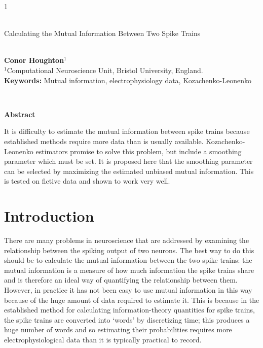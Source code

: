\documentclass[12pt]{article}
\begin{document}
\hspace{13.9cm}1

\ \vspace{20mm}\\

{\LARGE Calculating the Mutual Information Between Two Spike Trains}

\ \\
{\bf \large Conor Houghton$^{\displaystyle 1}$}\\
{$^{\displaystyle 1}$Computational Neuroscience Unit, Bristol University, England.}\\
%

{\bf Keywords:} Mutual information, electrophysiology data, Kozachenko-Leonenko

\thispagestyle{empty}
%
\ \vspace{-0mm}\\
%
\begin{center} {\bf Abstract} \end{center}
It is difficulty to estimate the mutual information between spike
trains because established methods require more data than is usually
available. Kozachenko-Leonenko estimators promise to solve this
problem, but include a smoothing parameter which must be set. It is
proposed here that the smoothing parameter can be selected by
maximizing the estimated unbiased mutual information. This is tested
on fictive data and shown to work very well.

\section{Introduction}

There are many problems in neuroscience that are addressed by
examining the relationship between the spiking output of two
neurons. The best way to do this should be to calculate the mutual
information between the two spike trains: the mutual information is a
measure of how much information the spike trains share and is
therefore an ideal way of quantifying the relationship between
them. However, in practice it has not been easy to use mutual
information in this way because of the huge amount of data required to
estimate it. This is because in the established method for calculating
information-theory quantities for spike trains, the spike trains are
converted into \lq{}words\rq{} by discretizing time; this produces a
huge number of words and so estimating their probabilities requires
more electrophysiological data than it is typically practical to
record.
\end{document}
